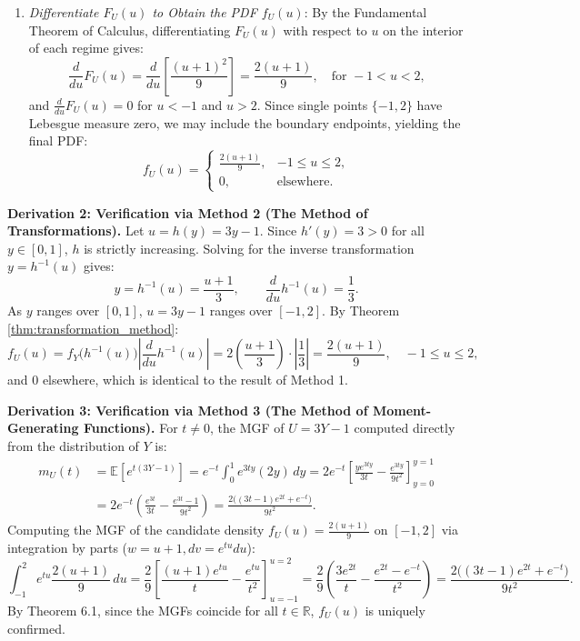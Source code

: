 \documentclass[11pt, letterpaper]{article}
\theoremstyle{definition}
\theoremstyle{remark}
\newcommand{\R}{\mathbb{R}}
\newcommand{\E}{\mathbb{E}}
\begin{document}
\begin{enumerate}[label=\textbf{Step \arabic*:}]
    \item \textit{Differentiate $F_U(u)$ to Obtain the PDF $f_U(u)$}: By the Fundamental Theorem of Calculus, differentiating $F_U(u)$ with respect to $u$ on the interior of each regime gives:
    \[
        \frac{d}{du} F_U(u) = \frac{d}{du}\left[\frac{(u+1)^2}{9}\right] = \frac{2(u + 1)}{9}, \quad \text{for } -1 < u < 2,
    \]
    and $\frac{d}{du}F_U(u) = 0$ for $u < -1$ and $u > 2$. Since single points $\{-1, 2\}$ have Lebesgue measure zero, we may include the boundary endpoints, yielding the final PDF:
    \[
        f_U(u) = \begin{cases}
            \displaystyle \frac{2(u + 1)}{9}, & -1 \le u \le 2, \\[8pt]
            0, & \text{elsewhere.}
        \end{cases}
    \]
\end{enumerate}

\textbf{Derivation 2: Verification via Method 2 (The Method of Transformations).}
Let $u = h(y) = 3y - 1$. Since $h'(y) = 3 > 0$ for all $y \in [0, 1]$, $h$ is strictly increasing. Solving for the inverse transformation $y = h^{-1}(u)$ gives:
\[
    y = h^{-1}(u) = \frac{u + 1}{3}, \qquad \frac{d}{du} h^{-1}(u) = \frac{1}{3}.
\]
As $y$ ranges over $[0, 1]$, $u = 3y - 1$ ranges over $[-1, 2]$. By Theorem \ref{thm:transformation_method}:
\[
    f_U(u) = f_Y\big(h^{-1}(u)\big) \left| \frac{d}{du} h^{-1}(u) \right| = 2\left(\frac{u + 1}{3}\right) \cdot \left|\frac{1}{3}\right| = \frac{2(u + 1)}{9}, \quad -1 \le u \le 2,
\]
and $0$ elsewhere, which is identical to the result of Method 1.

\textbf{Derivation 3: Verification via Method 3 (The Method of Moment-Generating Functions).}
For $t \neq 0$, the MGF of $U = 3Y - 1$ computed directly from the distribution of $Y$ is:
\begin{align*}
    m_U(t) &= \E[e^{t(3Y - 1)}] = e^{-t} \int_0^1 e^{3ty} (2y) \, dy = 2e^{-t} \left[ \frac{y e^{3ty}}{3t} - \frac{e^{3ty}}{9t^2} \right]_{y=0}^{y=1} \\
    &= 2e^{-t} \left( \frac{e^{3t}}{3t} - \frac{e^{3t} - 1}{9t^2} \right) = \frac{2\big((3t - 1)e^{2t} + e^{-t}\big)}{9t^2}.
\end{align*}
Computing the MGF of the candidate density $f_U(u) = \frac{2(u+1)}{9}$ on $[-1, 2]$ via integration by parts ($w = u+1, dv = e^{tu} du$):
\[
    \int_{-1}^2 e^{tu} \frac{2(u+1)}{9} \, du = \frac{2}{9} \left[ \frac{(u+1)e^{tu}}{t} - \frac{e^{tu}}{t^2} \right]_{u=-1}^{u=2} = \frac{2}{9}\left(\frac{3e^{2t}}{t} - \frac{e^{2t} - e^{-t}}{t^2}\right) = \frac{2\big((3t - 1)e^{2t} + e^{-t}\big)}{9t^2}.
\]
By Theorem 6.1, since the MGFs coincide for all $t \in \R$, $f_U(u)$ is uniquely confirmed.
\end{document}
